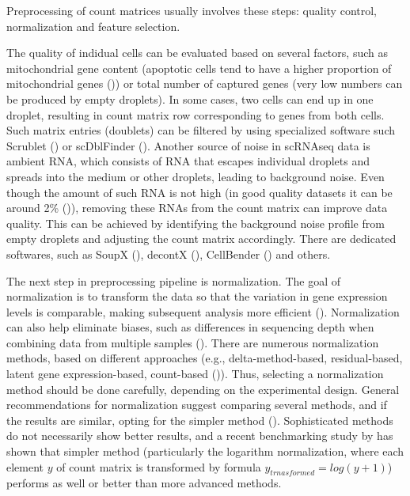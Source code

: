 Preprocessing of count matrices usually involves these steps:
quality control, normalization and feature selection.

The quality of indidual cells can be evaluated based on several factors, such as mitochondrial gene content
(apoptotic cells tend to have a higher proportion of mitochondrial genes (\cite{Heumos2023})) or
total number of captured genes (very low numbers can be produced by empty droplets).
In some cases, two cells can end up in one droplet,
resulting in count matrix row corresponding to genes from  both cells.
Such matrix entries (doublets) can be filtered by using specialized software
such Scrublet (\cite{Wolock2019}) or scDblFinder (\cite{Germain2022}).
Another source of noise in scRNAseq data is ambient RNA,
which consists of RNA that escapes individual droplets and spreads into the medium or other droplets,
leading to background noise.
Even though the amount of such RNA is not high (in good quality datasets it can be around 2\% (\cite{Young2020})),
removing these RNAs from the count matrix can improve data quality.
This can be achieved by identifying the background noise profile from empty droplets and
adjusting the count matrix accordingly.
There are dedicated softwares,
such as SoupX (\cite{Young2020}), decontX (\cite{Yang2020}), CellBender (\cite{Fleming2023}) and others.

The next step in preprocessing pipeline is normalization.
The goal of normalization is to transform the data so that the variation in gene expression levels is comparable,
making subsequent analysis more efficient (\cite{Ahlmann2023}).
Normalization can also help eliminate biases,
such as differences in sequencing depth when combining data from multiple samples (\cite{Lingen2024}).
There are numerous normalization methods, based on different approaches
(e.g., delta-method-based, residual-based, latent gene expression-based, count-based (\cite{Ahlmann2023})).
Thus, selecting a normalization method should be done carefully, depending on the experimental design.
General recommendations for normalization suggest comparing several methods,
and if the results are similar, opting for the simpler method (\cite{Lingen2024}).
Sophisticated methods do not necessarily show better results, and a recent benchmarking study by \textcite{Ahlmann2023}
has shown that simpler method (particularly the logarithm normalization,
where each element $y$ of count matrix is transformed by formula $y_{trnasformed} = log(y+1)$)
performs as well or better than more advanced methods.

